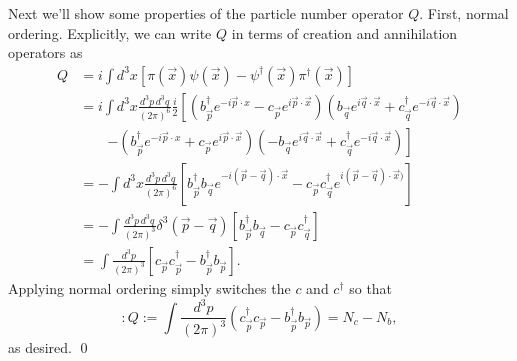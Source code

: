 Next we'll show some properties of the particle number operator $Q$. First, normal ordering. Explicitly, we can write $Q$ in terms of creation and annihilation operators as
\begin{align*}
    Q&= i\int d^3x [\pi(\vec x)\psi(\vec x)-\psi^\dagger (\vec x) \pi^\dagger (\vec x)]\\
    &=i\int d^3x \frac{d^3p \, d^3q}{(2\pi)^6} \frac{i}{2} 
    \left[(b_{\vec p}^\dagger e^{-i\vec p \cdot x}-c_{\vec p}e^{i\vec p\cdot \vec x})(b_{\vec q} e^{i\vec q \cdot \vec x}+c_{\vec q}^\dagger e^{-i\vec q \cdot \vec x})\right.\\
    &{}\qquad\left.
    -(b_{\vec p}^\dagger e^{-i\vec p \cdot x}+c_{\vec p}e^{i\vec p\cdot \vec x})(-b_{\vec q} e^{i\vec q \cdot \vec x}+c_{\vec q}^\dagger e^{-i\vec q \cdot \vec x})\right]\\
    &= -\int d^3x \frac{d^3p \, d^3q}{(2\pi)^6} 
    [b_{\vec p}^\dagger b_{\vec q} e^{-i(\vec p - \vec q) \cdot \vec x} - c_{\vec p} c_{\vec q}^\dagger e^{i(\vec p -\vec q) \cdot \vec x)}]\\
    &= -\int \frac{d^3p \, d^3q}{(2\pi)^3}\delta^3(\vec p -\vec q) 
    [b_{\vec p}^\dagger b_{\vec q} - c_{\vec p} c_{\vec q}^\dagger]\\
    &= \int \frac{d^3p}{(2\pi)^3} [c_{\vec p} c_{\vec p}^\dagger-b_{\vec p}^\dagger b_{\vec p}].
\end{align*}
Applying normal ordering simply switches the $c$ and $c^\dagger$ so that
\begin{equation*}
    :Q:=\int \frac{d^3 p}{(2\pi)^3} (c_{\vec p}^\dagger c_{\vec p}- b_{\vec p}^\dagger b_{\vec p})=N_c-N_b,
\end{equation*}
as desired. \qed